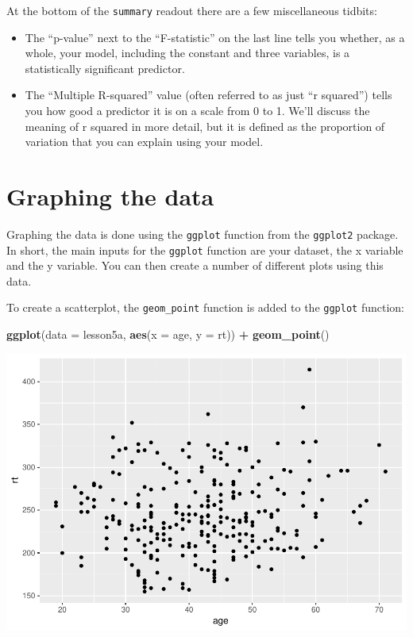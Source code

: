 \documentclass[]{book}
\newenvironment{Shaded}{\begin{snugshade}}{\end{snugshade}}
\newcommand{\DataTypeTok}[1]{\textcolor[rgb]{0.13,0.29,0.53}{#1}}
\newcommand{\KeywordTok}[1]{\textcolor[rgb]{0.13,0.29,0.53}{\textbf{#1}}}
\newcommand{\NormalTok}[1]{#1}
\newcommand{\OperatorTok}[1]{\textcolor[rgb]{0.81,0.36,0.00}{\textbf{#1}}}
\newcommand{\StringTok}[1]{\textcolor[rgb]{0.31,0.60,0.02}{#1}}
\begin{document}
At the bottom of the \texttt{summary} readout there are a few
miscellaneous tidbits:

\begin{itemize}
\item
  The ``p-value'' next to the ``F-statistic'' on the last line tells you
  whether, as a whole, your model, including the constant and three
  variables, is a statistically significant predictor.
\item
  The ``Multiple R-squared'' value (often referred to as just ``r
  squared'') tells you how good a predictor it is on a scale from 0 to
  1. We'll discuss the meaning of r squared in more detail, but it is
  defined as the proportion of variation that you can explain using your
  model.
\end{itemize}

\hypertarget{graphing-the-data}{%
\section{Graphing the data}\label{graphing-the-data}}

Graphing the data is done using the \texttt{ggplot} function from the
\texttt{ggplot2} package. In short, the main inputs for the
\texttt{ggplot} function are your dataset, the x variable and the y
variable. You can then create a number of different plots using this
data.

To create a scatterplot, the \texttt{geom\_point} function is added to
the \texttt{ggplot} function:

\begin{Shaded}
\begin{Highlighting}[]
\KeywordTok{ggplot}\NormalTok{(}\DataTypeTok{data =}\NormalTok{ lesson5a,}
       \KeywordTok{aes}\NormalTok{(}\DataTypeTok{x =}\NormalTok{ age, }\DataTypeTok{y =}\NormalTok{ rt)) }\OperatorTok{+}
\StringTok{  }\KeywordTok{geom_point}\NormalTok{()}
\end{Highlighting}
\end{Shaded}

\includegraphics{05-week5_files/figure-latex/section5j-1.pdf}
\end{document}
